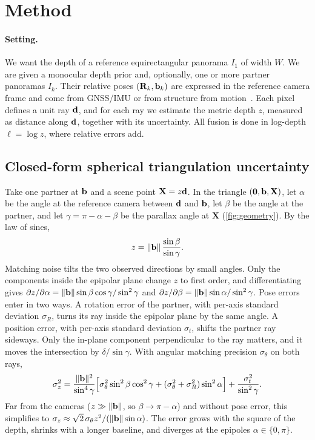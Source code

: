 \section{Method}
\label{sec:method}

\paragraph{Setting.}
We want the depth of a reference equirectangular panorama $I_1$ of width $W$. We are given a monocular
depth prior and, optionally, one or more partner panoramas $I_k$. Their relative poses
$(\mathbf{R}_k,\mathbf{b}_k)$ are expressed in the reference camera frame and come from GNSS/IMU or from
structure from motion~\cite{schoenberger2016sfm}. Each pixel defines a unit ray $\mathbf{d}$, and for each
ray we estimate the metric depth $z$, measured as distance along $\mathbf{d}$, together with its
uncertainty. All fusion is done in log-depth $\ell=\log z$, where relative errors add.

\subsection{Closed-form spherical triangulation uncertainty}
\label{sec:sigma}



Take one partner at $\mathbf{b}$ and a scene point $\mathbf{X}=z\mathbf{d}$. In the triangle
$(\mathbf{0},\mathbf{b},\mathbf{X})$, let $\alpha$ be the angle at the reference camera between $\mathbf{d}$ and
$\mathbf{b}$, let $\beta$ be the angle at the partner, and let $\gamma=\pi-\alpha-\beta$ be the parallax
angle at $\mathbf{X}$ (\cref{fig:geometry}). By the law of sines,
\begin{equation}
  z = \|\mathbf{b}\|\,\frac{\sin\beta}{\sin\gamma}.
\end{equation}
Matching noise tilts the two observed directions by small angles. Only the components inside the
epipolar plane change $z$ to first order, and differentiating gives
$\partial z/\partial\alpha=\|\mathbf{b}\|\sin\beta\cos\gamma/\sin^2\gamma$ and
$\partial z/\partial\beta=\|\mathbf{b}\|\sin\alpha/\sin^2\gamma$. Pose errors enter in two ways. A rotation
error of the partner, with per-axis standard deviation $\sigma_R$, turns its ray inside the epipolar
plane by the same angle. A position error, with per-axis standard deviation $\sigma_t$, shifts the
partner ray sideways. Only the in-plane component perpendicular to the ray matters, and it moves the
intersection by $\delta/\sin\gamma$. With angular matching precision $\sigma_\theta$ on both rays,
\begin{equation}
  \sigma_z^2 = \frac{\|\mathbf{b}\|^2}{\sin^4\gamma}\Big[\sigma_\theta^2\sin^2\beta\cos^2\gamma
  + (\sigma_\theta^2+\sigma_R^2)\sin^2\alpha\Big] + \frac{\sigma_t^2}{\sin^2\gamma}.
  \label{eq:sigma}
\end{equation}
Far from the cameras ($z\gg\|\mathbf{b}\|$, so $\beta\to\pi-\alpha$) and without pose error, this simplifies
to $\sigma_z\approx\sqrt{2}\,\sigma_\theta z^2/(\|\mathbf{b}\|\sin\alpha)$. The error grows with the square
of the depth, shrinks with a longer baseline, and diverges at the epipoles $\alpha\in\{0,\pi\}$.

